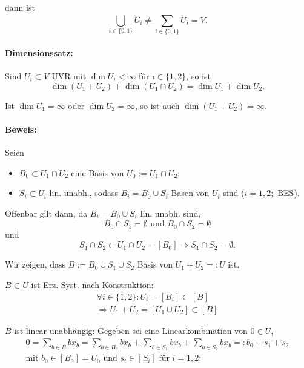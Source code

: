 	dann ist 
		\begin{equation*}
		\bigcup_{i\in \{0,1\}}\tilde{U}_i \neq \sum_{i\in \{0,1\}}\tilde{U}_i = V.
		\end{equation*}
\paragraph{Dimensionssatz: }
	Sind $ U_i \subset V $ UVR mit $ \dim U_i < \infty $ für $ i\in \{1,2\} $, so ist
		\begin{equation*}
		\dim (U_1+U_2) + \dim (U_1\cap U_2) = \dim U_1 + \dim U_2.
		\end{equation*}
		
	Ist $ \dim U_1 = \infty$ oder $ \dim U_2=\infty $, so ist auch $ \dim (U_1+U_2)=\infty $.
\paragraph{Beweis: }
	Seien
		\begin{itemize}
		\item $ B_0 \subset U_1\cap U_2 $ eine Basis von $ U_0 := U_1\cap U_2 $;
		\item $ S_i \subset U_i $ lin. unabh., sodass $ B_i = B_0 \cup S_i $ Basen von $ U_i $ sind ($ i = 1,2; $ BES).
		\end{itemize}
	
	Offenbar gilt dann, da $ B_i = B_0\cup S_i $ lin. unabh. sind,
		\begin{equation*}
		B_0\cap S_1 = \emptyset \text{ und } B_0\cap S_2 = \emptyset
		\end{equation*}
	und 
		\begin{equation*}
		S_1\cap S_2 \subset U_1\cap U_2 = [B_0] \Rightarrow S_1\cap S_2 = \emptyset.
		\end{equation*}
		
	Wir zeigen, dass $ B:= B_0\cup S_1\cup S_2 $ Basis von $ U_1 + U_2 =: U $ ist.
	
	$ B\subset U $ ist Erz. Syst. nach Konstruktion:
		\begin{gather*}
		\forall i\in \{1,2\} : U_i=[B_i]\subset [B]\\
		\Rightarrow U_1+U_2 = [U_1\cup U_2]\subset [B]
		\end{gather*}
	
	$ B $ ist linear unabhängig: Gegeben sei eine Linearkombination von $ 0\in U $,
		\begin{gather*}
		0 = \sum_{b\in B}bx_b = \sum_{b\in B_0}bx_b + \sum_{b\in S_1}bx_b + \sum_{b\in S_2}bx_b =: b_0 + s_1+ s_2\\
		\text{mit } b_0\in [B_0] = U_0 \text{ und } s_i\in [S_i] \text{ für } i= 1,2;
		\end{gather*}
		

